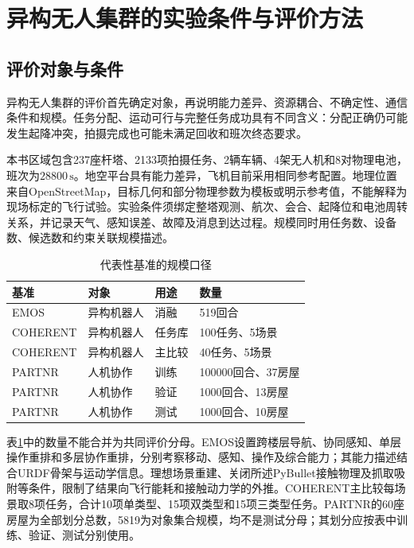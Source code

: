 \section{异构无人集群的实验条件与评价方法}
\label{sec:07_01}

\subsection{评价对象与条件}

异构无人集群的评价首先确定对象，再说明能力差异、资源耦合、不确定性、通信条件和规模。任务分配、运动可行与完整任务成功具有不同含义：分配正确仍可能发生起降冲突，拍摄完成也可能未满足回收和班次终态要求。

本书区域包含237座杆塔、2133项拍摄任务、2辆车辆、4架无人机和8对物理电池，班次为$28800\,\mathrm{s}$。地空平台具有能力差异，飞机目前采用相同参考配置。地理位置来自OpenStreetMap，目标几何和部分物理参数为模板或明示参考值，不能解释为现场标定的飞行试验\cite{OSMData}。实验条件须绑定整塔观测、航次、会合、起降位和电池周转关系，并记录天气、感知误差、故障及消息到达过程。规模同时用任务数、设备数、候选数和约束关联规模描述。

\begin{table}[htbp]
\centering
\caption{代表性基准的规模口径}
\label{s0701:benchmarks}
\small
\begin{tabular}{llll}
\toprule
基准 & 对象 & 用途 & 数量\\
\midrule
EMOS & 异构机器人 & 消融 & 519回合\\
COHERENT & 异构机器人 & 任务库 & 100任务、5场景\\
COHERENT & 异构机器人 & 主比较 & 40任务、5场景\\
PARTNR & 人机协作 & 训练 & 100000回合、37房屋\\
PARTNR & 人机协作 & 验证 & 1000回合、13房屋\\
PARTNR & 人机协作 & 测试 & 1000回合、10房屋\\
\bottomrule
\end{tabular}
\end{table}

表\ref{s0701:benchmarks}中的数量不能合并为共同评价分母。EMOS设置跨楼层导航、协同感知、单层操作重排和多层协作重排，分别考察移动、感知、操作及综合能力；其能力描述结合URDF骨架与运动学信息。理想场景重建、关闭所述PyBullet接触物理及抓取吸附等条件，限制了结果向飞行能耗和接触动力学的外推\cite{EMOS2025}。COHERENT主比较每场景取8项任务，合计10项单类型、15项双类型和15项三类型任务\cite{COHERENT2025}。PARTNR的60座房屋为全部划分总数，5819为对象集合规模，均不是测试分母；其划分应按表中训练、验证、测试分别使用\cite{PARTNR2025}。

